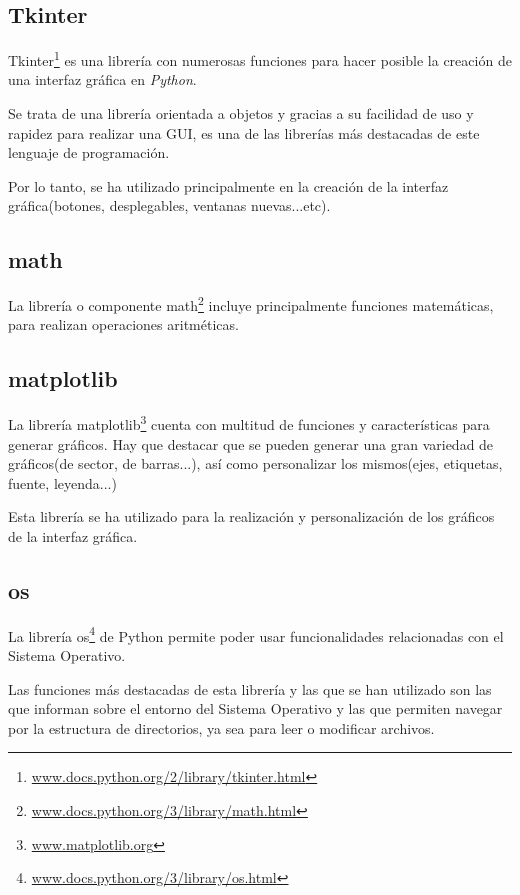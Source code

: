 \subsection{Tkinter}
Tkinter\footnote{\href{https://docs.python.org/2/library/tkinter.html}{www.docs.python.org/2/library/tkinter.html}} es una librería con numerosas funciones para hacer posible la creación de una interfaz gráfica en \emph{Python}.

Se trata de una librería orientada a objetos y gracias a su facilidad de uso y rapidez para realizar una GUI, es una de las librerías más destacadas de este lenguaje de programación.

Por lo tanto, se ha utilizado principalmente en la creación de la interfaz gráfica(botones, desplegables, ventanas nuevas...etc).


\subsection{math}
La librería o componente math\footnote{\href{https://docs.python.org/3/library/math.html}{www.docs.python.org/3/library/math.html}} incluye principalmente funciones matemáticas, para realizan operaciones aritméticas. 


\subsection{matplotlib}
La librería matplotlib\footnote{\href{https://matplotlib.org/}{www.matplotlib.org}} cuenta con multitud de funciones y características para generar gráficos. Hay que destacar que se pueden generar una gran variedad de gráficos(de sector, de barras...), así como personalizar los mismos(ejes, etiquetas, fuente, leyenda...)

Esta librería se ha utilizado para la realización y personalización de los gráficos de la interfaz gráfica.


\subsection{os}
La librería os\footnote{\href{https://docs.python.org/3/library/os.html}{www.docs.python.org/3/library/os.html}} de Python permite poder usar funcionalidades relacionadas con el Sistema Operativo. 

Las funciones más destacadas de esta librería y las que se han utilizado son las que informan sobre el entorno del Sistema Operativo y las que permiten navegar por la estructura de directorios, ya sea para leer o modificar archivos.


